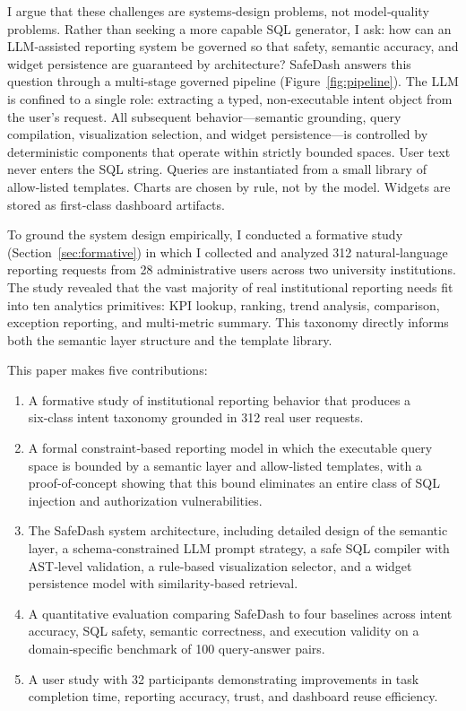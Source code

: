 \documentclass[11pt]{article}
\begin{document}
I argue that these challenges are systems‑design problems, not model‑quality problems. Rather than seeking a more capable SQL generator, I ask: how can an LLM‑assisted reporting system be governed so that safety, semantic accuracy, and widget persistence are guaranteed by architecture? SafeDash answers this question through a multi‑stage governed pipeline (Figure~\ref{fig:pipeline}). The LLM is confined to a single role: extracting a typed, non‑executable intent object from the user's request. All subsequent behavior—semantic grounding, query compilation, visualization selection, and widget persistence—is controlled by deterministic components that operate within strictly bounded spaces. User text never enters the SQL string. Queries are instantiated from a small library of allow‑listed templates. Charts are chosen by rule, not by the model. Widgets are stored as first‑class dashboard artifacts.

To ground the system design empirically, I conducted a formative study (Section~\ref{sec:formative}) in which I collected and analyzed 312 natural‑language reporting requests from 28 administrative users across two university institutions. The study revealed that the vast majority of real institutional reporting needs fit into ten analytics primitives: KPI lookup, ranking, trend analysis, comparison, exception reporting, and multi‑metric summary. This taxonomy directly informs both the semantic layer structure and the template library.

This paper makes five contributions:
\begin{enumerate}
  \item A formative study of institutional reporting behavior that produces a six‑class intent taxonomy grounded in 312 real user requests.
  \item A formal constraint‑based reporting model in which the executable query space is bounded by a semantic layer and allow‑listed templates, with a proof‑of‑concept showing that this bound eliminates an entire class of SQL injection and authorization vulnerabilities.
  \item The SafeDash system architecture, including detailed design of the semantic layer, a schema‑constrained LLM prompt strategy, a safe SQL compiler with AST‑level validation, a rule‑based visualization selector, and a widget persistence model with similarity‑based retrieval.
  \item A quantitative evaluation comparing SafeDash to four baselines across intent accuracy, SQL safety, semantic correctness, and execution validity on a domain‑specific benchmark of 100 query‑answer pairs.
  \item A user study with 32 participants demonstrating improvements in task completion time, reporting accuracy, trust, and dashboard reuse efficiency.
\end{enumerate}
\end{document}
